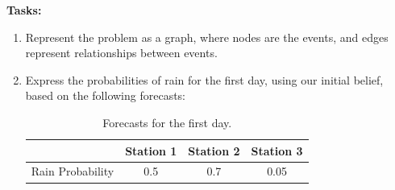 \documentclass[11pt]{article}
\numberwithin{equation}{section}
\newcommand{\sol}[1]{
    }
\begin{document}
\textbf{Tasks:}
\begin{enumerate}
    \item Represent the problem as a graph, where nodes are the events, and edges represent relationships between events.

    \sol{
        \paragraph{Notations}
        \begin{itemize}
            \item $C_i$: Station $i$ predicts correctly the weather.
            \item $R$: It will rain.
        \end{itemize}
        Using those notations, we can draw this graph representing the relationships between variables:
        
        {\centering
        \begin{tikzpicture}[node distance=1cm and 2cm, every node/.style={minimum width=1cm}, every path/.style={draw, thick}, edge/.style = {->,> = latex', >=stealth}]
            \node (C2) [draw, circle] {$C_2$};
            \node (C1) [draw, circle, left=of C2] {$C_1$};
            \node (C3) [draw, circle, right=of C2] {$C_3$};
            \node (R) [draw, circle, above=of C2] {$R$};
            
            \draw[edge] (R) to (C1);
            \draw[edge] (R) to (C2);
            \draw[edge] (R) to (C3);
        \end{tikzpicture}
        }
    }

    \item Express the probabilities of rain for the first day, using our initial belief, based on the following forecasts:
    \begin{table}[h]
        \centering
        \begin{tabular}{ c | c c c }
          & Station 1 & Station 2 & Station 3 \\ 
         \hline
         Rain Probability & 0.5 & 0.7 & 0.05 \\
        \end{tabular}
        \caption{Forecasts for the first day.}
    \end{table}

    \sol{
        We have an initial belief that we should believe equally in all three stations, that is: $P(C_i) = 1/3$, for $i\in\{1,2,3\}$.
        Additionally, the entries in the table correspond to the rain probabilities given each station $i$'s forecast: $P(R | C_i)$.
        Thus:

}
\end{enumerate}
\end{document}
